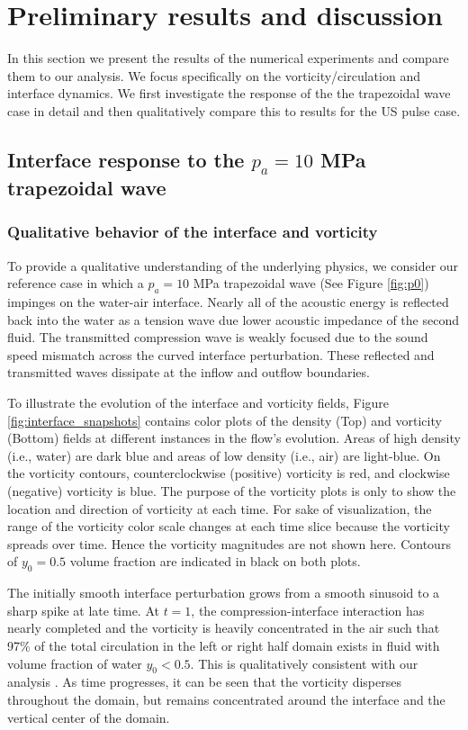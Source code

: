 \section{Preliminary results and discussion}%
\label{sec:usbe_lung_results}%
In this section we present the results of the numerical experiments
and compare them to our analysis. We focus specifically on the
vorticity/circulation and interface dynamics. We first investigate the
response of the the trapezoidal wave case in detail and then
qualitatively compare this to results for the \ac{US} pulse case.
%
%
\subsection{Interface response to the $p_a=10$ MPa trapezoidal wave}
\label{subsec:Interface response to }
\subsubsection{Qualitative behavior of the interface and vorticity}
\label{subsubsec:Qualitative}
To provide a qualitative understanding of the underlying physics, we
consider our reference case in which a $p_a=10$ MPa trapezoidal wave
(See Figure \ref{fig:p0}) impinges on the water-air interface. Nearly
all of the acoustic energy is reflected back into the
water as a tension wave due lower acoustic impedance of the second
fluid. The transmitted compression wave is weakly focused due to the sound
speed mismatch across the curved interface perturbation. These
reflected and transmitted waves dissipate at the inflow and outflow
boundaries.

To illustrate the evolution of the interface and vorticity fields,
Figure \ref{fig:interface_snapshots} contains color plots of the
density (Top) and vorticity (Bottom) fields at different instances in
the flow's evolution. Areas of high density (i.e., water) are dark
blue and areas of low density (i.e., air) are light-blue. On the
vorticity contours, counterclockwise (positive) vorticity is red, and
clockwise (negative) vorticity is blue. The purpose of the vorticity
plots is only to show the location and direction of vorticity at each
time. For sake of visualization, the range of the vorticity color
scale changes at each time slice because the vorticity spreads over
time. Hence the vorticity magnitudes are not shown here. Contours of
$y_0=0.5$ volume fraction are indicated in black on both plots. 

The initially smooth interface perturbation grows from a smooth
sinusoid to a sharp spike at late time. At $t=1$, the
compression-interface interaction has nearly completed and the
vorticity is heavily concentrated in the air such that 97\% of the
total circulation in the left or right half domain exists in fluid
with volume fraction of water $y_0<0.5$. This is qualitatively
consistent with our analysis . As time progresses, it can be seen that
the vorticity disperses throughout the domain, but remains
concentrated around the interface and the vertical center of the
domain.

